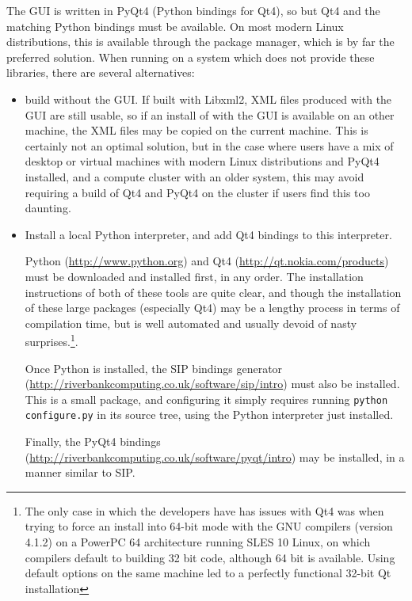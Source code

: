 \documentclass[a4paper,10pt,twoside]{article}
\begin{document}
The GUI is written in PyQt4 (Python bindings for Qt4), so but Qt4 and
the matching Python bindings must be available. On most modern
Linux distributions, this is available through the package manager,
which is by far the preferred solution. When running on a system which does
not provide these libraries, there are several alternatives:

\begin{itemize}

\item build \CS without the GUI. If built with Libxml2, XML files
      produced with the GUI are still usable, so if an install of \CS
      with the GUI is available on an other machine, the XML files
      may be copied on the current machine. This is certainly not an optimal
      solution, but in the case where users have a mix of desktop or virtual
      machines with modern Linux distributions and PyQt4 installed, and
      a compute cluster with an older system, this may avoid requiring
      a build of Qt4 and PyQt4 on the cluster if users find this too daunting.

\item Install a local Python interpreter, and add Qt4 bindings to this
      interpreter.

      Python (\url{http://www.python.org}) and Qt4
      (\url{http://qt.nokia.com/products}) must be downloaded  and
      installed first, in any order. The installation instructions of
      both of these tools are quite clear, and though the installation of these
      large packages (especially Qt4) may be a lengthy process in terms of
      compilation time, but is well automated and usually devoid of nasty
      surprises.\footnote{The only case in which the \CS developers
      have has issues with Qt4 was when trying to force an install into
      64-bit mode with the GNU compilers (version 4.1.2) on a PowerPC 64
      architecture running SLES 10 Linux, on which compilers default
      to building 32 bit code, although 64 bit is available. Using default
      options on the same machine led to a perfectly functional 32-bit Qt
      installation}.

      Once Python is installed, the SIP bindings generator
      (\url{http://riverbankcomputing.co.uk/software/sip/intro})
      must also be installed. This is a small package, and configuring it
      simply requires running \texttt{python configure.py} in its source
      tree, using the Python interpreter just installed.

      Finally, the PyQt4 bindings
      (\url{http://riverbankcomputing.co.uk/software/pyqt/intro}) may be
      installed, in a manner similar to SIP.


\end{itemize}
\end{document}
